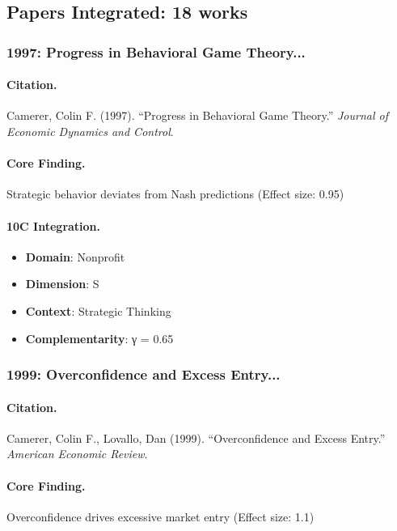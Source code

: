 \subsection{Papers Integrated: 18 works}

\subsubsection{1997: Progress in Behavioral Game Theory...}

\paragraph{Citation.}
Camerer, Colin F. (1997). ``Progress in Behavioral Game Theory.''
\textit{Journal of Economic Dynamics and Control}.

\paragraph{Core Finding.}
Strategic behavior deviates from Nash predictions (Effect size: 0.95)

\paragraph{10C Integration.}
\begin{itemize}[nosep]
  \item \textbf{Domain}: Nonprofit
  \item \textbf{Dimension}: S
  \item \textbf{Context}: Strategic Thinking
  \item \textbf{Complementarity}: γ = 0.65
\end{itemize}

\subsubsection{1999: Overconfidence and Excess Entry...}

\paragraph{Citation.}
Camerer, Colin F., Lovallo, Dan (1999). ``Overconfidence and Excess Entry.''
\textit{American Economic Review}.

\paragraph{Core Finding.}
Overconfidence drives excessive market entry (Effect size: 1.1)

